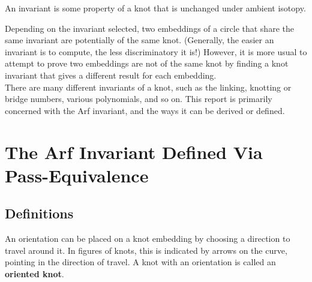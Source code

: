 \documentclass{article}
\begin{document}
\begin{definition}[Invariant] An invariant is some property of a knot that is unchanged under ambient isotopy.
\end{definition}
Depending on the invariant selected, two embeddings of a circle that share the same invariant are potentially of the same knot. (Generally, the easier an invariant is to compute, the less discriminatory it is!) However, it is more usual to attempt to prove two embeddings are not of the same knot by finding a knot invariant that gives a different result for each embedding.\\
There are many different invariants of a knot, such as the linking, knotting or bridge numbers, various polynomials, and so on. This report is primarily concerned with the Arf invariant, and the ways it can be derived or defined.\\


\section{The Arf Invariant Defined Via Pass-Equivalence}
\subsection{Definitions}

\begin{definition}[Orientation] An orientation can be placed on a knot embedding by choosing a direction to travel around it. In figures of knots, this is indicated by arrows on the curve, pointing in the direction of travel. A knot with an orientation is called an \textbf{oriented knot}.
\end{definition}
\end{document}
